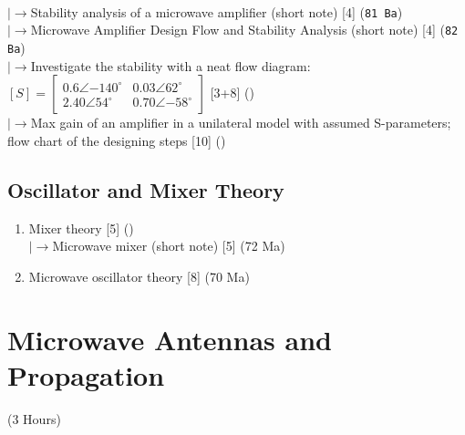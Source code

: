 \documentclass[12pt]{article}
\newcommand{\lb}{\\$\left|\rightarrow\right.$}
\begin{document}
\begin{enumerate}[topsep=0pt, noitemsep]
        \lb Stability analysis of a microwave amplifier (short note) \hfill [4] (\texttt{81 Ba})
        \lb Microwave Amplifier Design Flow and Stability Analysis (short note) \hfill [4] (\texttt{82 Ba})
        \lb Investigate the stability with a neat flow diagram: $[S] = \begin{bmatrix}0.6\angle{-140^\circ} & 0.03\angle62^\circ\\ 2.40\angle54^\circ & 0.70\angle{-58^\circ}\end{bmatrix}$ \hfill [3+8] ()
        \lb Max gain of an amplifier in a unilateral model with assumed S-parameters; flow chart of the designing steps \hfill [10] ()
    \end{enumerate}

  \subsection{Oscillator and Mixer Theory}
    \begin{enumerate}[topsep=0pt, noitemsep]
      \item Mixer theory \hfill [5] ()
        \lb Microwave mixer (short note) \hfill [5] (72 Ma)
      \item Microwave oscillator theory \hfill [8] (70 Ma)
    \end{enumerate}

\pagebreak
\section{Microwave Antennas and Propagation}
\begin{center}(3 Hours)\end{center}
\end{document}

